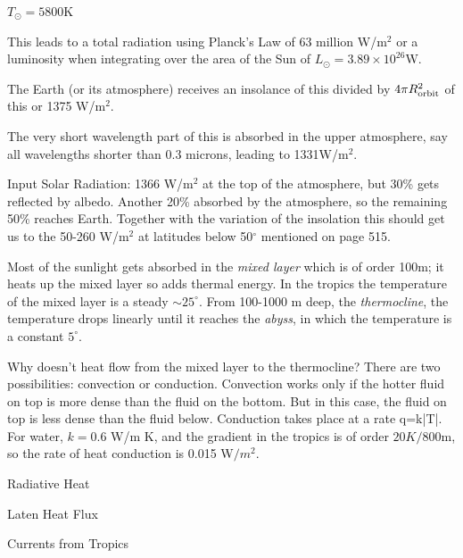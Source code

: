 \documentclass[11pt]{book}
\begin{document}




\bei
\item $T_\odot=5800$K
\item This leads to a total radiation using Planck's Law of 63 million W/m$^2$ or a luminosity when integrating over the area of the Sun of $L_\odot=3.89\times 10^{26}$W.
\item The Earth (or its atmosphere) receives an insolance of this divided by $4\pi R_{\rm orbit}^2$ of this or 1375 W/m$^2$.
\item The very short wavelength part of this is absorbed in the upper atmosphere, say all wavelengths shorter than 0.3 microns, leading to 1331W/m$^2$.
\eei
{}



\bei
\item Input Solar Radiation: 1366 W/m$^2$ at the top of the atmosphere, but 30\% gets reflected by albedo. Another 20\% absorbed by the atmosphere, so the remaining 50\% reaches Earth. Together with the variation of the insolation this should get us to the 50-260 W/m$^2$ at latitudes below 50$^\circ$ mentioned on page 515.
\item Most of the sunlight gets absorbed in the {\it mixed layer} which is of order 100m; it heats up the mixed layer so adds thermal energy. In the tropics the temperature of the mixed layer is a steady $\sim25^\circ$. From 100-1000 m deep, the {\it thermocline}, the temperature drops linearly until it reaches the {\it abyss}, in which the temperature is a constant $5^\circ$.
\item Why doesn't heat flow from the mixed layer to the thermocline? There are two possibilities: convection or conduction. Convection works only if the hotter fluid on top is more dense than the fluid on the bottom. But in this case, the fluid on top is less dense than the fluid below. Conduction takes place at a rate
\be
q=k|\nabla T|.\ee
For water, $k=0.6$ W/m K, and the gradient in the tropics is of order $20 K/800$m, so the rate of heat conduction is 0.015 W$/m^2$. 
\item Radiative Heat
\item Laten Heat Flux
\item Currents from Tropics 
\eei
\end{document}
